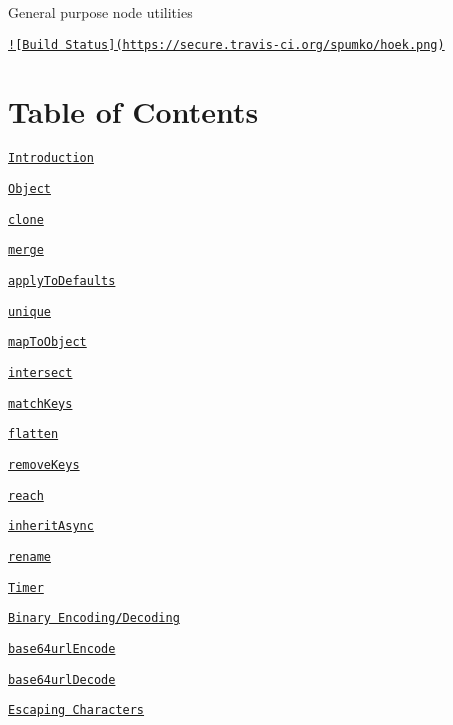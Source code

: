 \href{https://github.com/spumko}{\tt } 

General purpose node utilities

\href{http://travis-ci.org/spumko/hoek}{\tt !\mbox{[}Build Status\mbox{]}(https\+://secure.\+travis-\/ci.\+org/spumko/hoek.\+png)}

\section*{Table of Contents}


\begin{DoxyItemize}
\item \href{#introduction}{\tt Introduction}
\item \href{#object}{\tt Object}
\begin{DoxyItemize}
\item \href{#cloneobj}{\tt clone}
\item \href{#mergetarget-source-isnulloverride-ismergearrays}{\tt merge}
\item \href{#applytodefaultsdefaults-options}{\tt apply\+To\+Defaults}
\item \href{#uniquearray-key}{\tt unique}
\item \href{#maptoobjectarray-key}{\tt map\+To\+Object}
\item \href{#intersectarray1-array2}{\tt intersect}
\item \href{#matchkeysobj-keys}{\tt match\+Keys}
\item \href{#flattenarray-target}{\tt flatten}
\item \href{#removekeysobject-keys}{\tt remove\+Keys}
\item \href{#reachobj-chain}{\tt reach}
\item \href{#inheritasyncself-obj-keys}{\tt inherit\+Async}
\item \href{#renameobj-from-to}{\tt rename}
\end{DoxyItemize}
\item \href{#timer}{\tt Timer}
\item \href{#binary}{\tt Binary Encoding/\+Decoding}
\begin{DoxyItemize}
\item \href{#binary64urlEncodevalue}{\tt base64url\+Encode}
\item \href{#binary64urlDecodevalue}{\tt base64url\+Decode}
\end{DoxyItemize}
\item \href{#escaped}{\tt Escaping Characters}
\begin{DoxyItemize}

\end{DoxyItemize}
\end{DoxyItemize}
